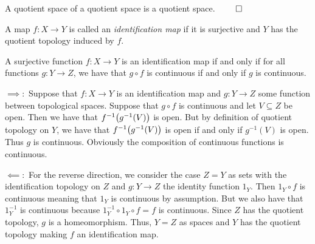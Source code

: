 \documentclass[letterpaper, 11pt, oneside]{book}
\begin{document}
\begin{prop}
  A quotient space of a quotient space is a quotient space. $\qed$
\end{prop}

\begin{defn}
  A map $f\colon X \to Y$ is called an \emph{identification map} if it is surjective and $Y$ has the quotient topology induced by $f$.
\end{defn}

\begin{prop}\label{prop: id_map_iff_all_g_cont}
  A surjective function $f\colon X \to Y$ is an identification map if and only if for all functions $g\colon Y \to Z$, we have that $g \circ f$ is continuous if and only if $g$ is continuous.
\end{prop}
\begin{pf}
  $\implies\colon$ Suppose that $f\colon X \to Y$ is an identification map and $g\colon Y \to Z$ some function between topological spaces.
  Suppose that $g \circ f$ is continuous and let $V \subseteq Z$ be open.
  Then we have that $f^{-1}\pqty{g^{-1}\pqty{V}}$ is open.
  But by definition of quotient topology on $Y$, we have that $f^{-1}\pqty{g^{-1}\pqty{V}}$ is open if and only if $g^{-1}(V)$ is open.
  Thus $g$ is continuous.
  Obviously the composition of continuous functions is continuous.

  $\impliedby\colon$ For the reverse direction, we consider the case  $Z = Y$ as sets with the identification topology on $Z$ and $g\colon Y \to Z$ the identity function $1_{Y}$.
  Then $1_{Y} \circ f$ is continuous meaning that $1_{Y}$ is continuous by assumption.
  But we also have that $1_{Y}^{-1}$ is continuous because $1_{Y}^{-1} \circ 1_{Y} \circ f = f$ is continuous.
  Since $Z$ has the quotient topology, $g$ is a homeomorphism.
  Thus, $Y = Z$ as spaces and $Y$ has the quotient topology making $f$ an identification map.
\end{pf}
\end{document}
